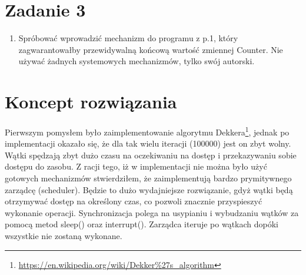 \documentclass[12pt]{article}
\begin{document}
\section{Zadanie 3}
\begin{enumerate}
    \item Spróbować wprowadzić mechanizm do programu z p.1, który zagwarantowałby przewidywalną końcową wartość zmiennej Counter. Nie używać żadnych systemowych mechanizmów, tylko swój autorski.
\end{enumerate}

\section{Koncept rozwiązania}
Pierwszym pomysłem było zaimplementowanie algorytmu Dekkera\footnote{\url{https://en.wikipedia.org/wiki/Dekker\%27s\_algorithm}}, jednak po implementacji okazało się, że dla tak wielu iteracji (100000) jest on zbyt wolny. Wątki spędzają zbyt dużo czasu na oczekiwaniu na dostęp i przekazywaniu sobie dostępu do zasobu. Z racji tego, iż w implementacji nie można było użyć gotowych mechanizmów stwierdziłem, że zaimplementują bardzo prymitywnego zarządcę (scheduler). Będzie to dużo wydajniejsze rozwiązanie, gdyż wątki będą otrzymywać dostęp na określony czas, co pozwoli znacznie przyspieszyć wykonanie operacji. Synchronizacja polega na usypianiu i wybudzaniu wątków za pomocą metod sleep() oraz interrupt(). Zarządca iteruje po wątkach dopóki wszystkie nie zostaną wykonane. 

\newpage
\end{document}
